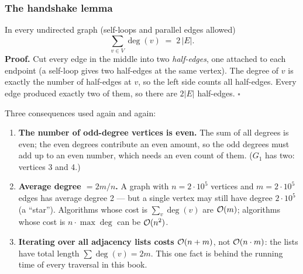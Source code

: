 \subsubsection*{The handshake lemma}

\begin{theorembox}
In every undirected graph (self-loops and parallel edges allowed)
\[
    \sum_{v\in V} \deg(v) \;=\; 2\,|E|.
\]
\textbf{Proof.} Cut every edge in the middle into two \emph{half-edges}, one attached to each endpoint (a self-loop gives two half-edges at the same vertex). The degree of $v$ is exactly the number of half-edges at $v$, so the left side counts all half-edges. Every edge produced exactly two of them, so there are $2|E|$ half-edges. \hfill$\square$
\end{theorembox}

\begin{diagrambox}
\end{diagrambox}

Three consequences used again and again:
\begin{enumerate}[leftmargin=*]
    \item \textbf{The number of odd-degree vertices is even.} The sum of all degrees is even; the even degrees contribute an even amount, so the odd degrees must add up to an even number, which needs an even count of them. ($G_1$ has two: vertices 3 and 4.)
    \item \textbf{Average degree $= 2m/n$.} A graph with $n=2\cdot10^5$ vertices and $m=2\cdot10^5$ edges has average degree 2 --- but a single vertex may still have degree $2\cdot10^5$ (a ``star''). Algorithms whose cost is $\sum_v \deg(v)$ are $\mathcal{O}(m)$; algorithms whose cost is $n\cdot\max\deg$ can be $\mathcal{O}(n^2)$.
    \item \textbf{Iterating over all adjacency lists costs $\mathcal{O}(n+m)$}, not $\mathcal{O}(n\cdot m)$: the lists have total length $\sum\deg(v)=2m$. This one fact is behind the running time of every traversal in this book.
\end{enumerate}

